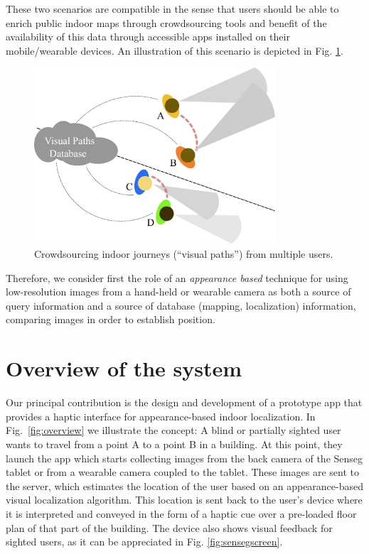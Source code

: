These two scenarios are compatible in the sense that users should be able to enrich public indoor maps through crowdsourcing tools and benefit of the availability of this data through accessible apps installed on their mobile/wearable devices. An illustration of this scenario is depicted in Fig. \ref{fig:associatingViews}.

\begin{figure}[h]
\centering
\includegraphics[width=0.8\textwidth]{gfx/Chapter06/AssociatingViews.pdf}
\caption{Crowdsourcing indoor journeys (``visual paths'') from multiple users.}
\label{fig:associatingViews}
\end{figure}

Therefore, we consider first the role of an {\em appearance based} technique for using low-resolution images from a hand-held or wearable camera as both a source of query information and a source of database (mapping, localization) information, comparing images in order to establish position. 

\section{Overview of the system}
\label{sec:overview}

Our principal contribution is the design and development of a prototype app that provides a haptic interface for appearance-based indoor localization. In Fig.~\ref{fig:overview} we illustrate the concept: A blind or partially sighted user wants to travel from a point A to a point B in a building. At this point, they launch the app which starts collecting images from the back camera of the Senseg tablet or from a wearable camera coupled to the tablet. These images are sent to the server, which estimates the location of the user based on an appearance-based visual localization algorithm. This location is sent back to the user's device where it is interpreted and conveyed in the form of a haptic cue over a pre-loaded floor plan of that part of the building. The device also shows visual feedback for sighted users, as it can be appreciated in Fig. \ref{fig:sensegscreen}.

